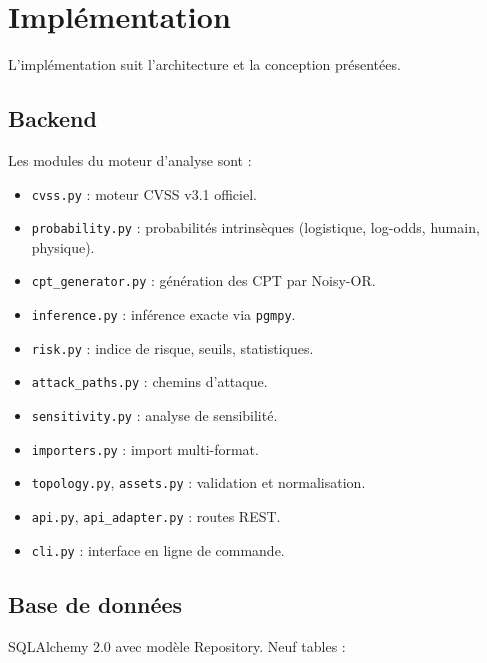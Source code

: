 \documentclass[12pt,a4paper]{article}
\newcommand{\forcereset}[1]{}
\begin{document}
\section{Implémentation}
\forcereset{6}

L'implémentation suit l'architecture et la conception présentées.

\subsection{Backend}
\forcereset{5}

Les modules du moteur d'analyse sont :

\begin{itemize}[leftmargin=1.2cm, itemsep=0.2\baselineskip]
    \item \texttt{cvss.py} : moteur CVSS v3.1 officiel.
    \item \texttt{probability.py} : probabilités intrinsèques (logistique, log-odds, humain, physique).
    \item \texttt{cpt\_generator.py} : génération des CPT par Noisy-OR.
    \item \texttt{inference.py} : inférence exacte via \texttt{pgmpy}.
    \item \texttt{risk.py} : indice de risque, seuils, statistiques.
    \item \texttt{attack\_paths.py} : chemins d'attaque.
    \item \texttt{sensitivity.py} : analyse de sensibilité.
    \item \texttt{importers.py} : import multi-format.
    \item \texttt{topology.py}, \texttt{assets.py} : validation et normalisation.
    \item \texttt{api.py}, \texttt{api\_adapter.py} : routes REST.
    \item \texttt{cli.py} : interface en ligne de commande.
\end{itemize}

\subsection{Base de données}
\forcereset{5}

SQLAlchemy 2.0 avec modèle Repository. Neuf tables :
\end{document}
